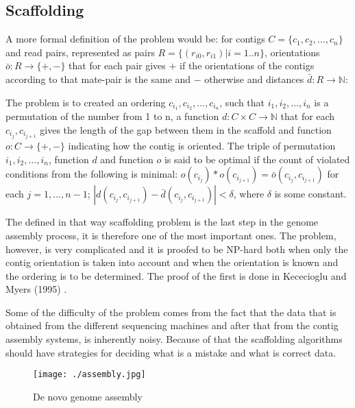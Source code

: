 \documentclass[11pt]{article}
\begin{document}
\subsection{Scaffolding}
\label{sub:Scaffolding} A more formal definition of the problem would be: for
contigs $C = \{c_1, c_2, \dots, c_n \}$ and read pairs, represented as pairs $R
= \{(r_{i0}, r_{i1}) | i = 1..n\}$, orientations $\bar{o}: R \rightarrow \{+,
-\}$ that for each pair gives $+$ if the orientations of the contigs according
to that mate-pair is the same and $-$ otherwise and distances $\bar{d}: R
\rightarrow \mathbb{N}$:

The problem is to created an ordering $c_{i_1}, c_{i_2}, \dots, c_{i_n}$, such
that $i_1, i_2, \dots, i_n$ is a permutation of the number from 1 to n, a
function $d: C \times C \rightarrow \mathbb{N}$ that for each $c_{i_j}, c_{i_{j
+ 1}}$ gives the length of the gap between them in the scaffold and function
$o:C \rightarrow \{+, -\}$ indicating how the contig is oriented. The triple of
permutation $i_1, i_2, \dots, i_n$, function $d$ and function $o$ is said to be
optimal if the count of violated conditions from the following is minimal:
$o(c_{i_j}) * o(c_{i_{j + 1}}) = \bar{o}(c_{i_j}, c_{i_{j + 1}})$ for each $j =
1,\dots, n - 1$; $\left| d(c_{i_j}, c_{i_{j + 1}}) - \bar{d}(c_{i_j}, c_{i_{j +
1}})\right| < \delta$, where $\delta$ is some constant.

The defined in that way scaffolding problem is the last step in the genome
assembly process, it is therefore one of the most important ones. The problem,
however, is very complicated and it is proofed to be NP-hard both when only the
contig orientation is taken into account and when the orientation is known and
the ordering is to be determined.  The proof of the first is done in Kececioglu
and Myers (1995) \cite{NP-hard}.

Some of the difficulty of the problem comes from the fact that the data that is
obtained from the different sequencing machines and after that from the contig
assembly systems, is inherently noisy. Because of that the scaffolding
algorithms should have strategies for deciding what is a mistake and what is
correct data.


\begin{figure}[h]
  \centering
  \texttt{[image: ./assembly.jpg]}
  \caption{De novo genome assembly}
  \label{fig:assembly_process}
\end{figure}
\end{document}
